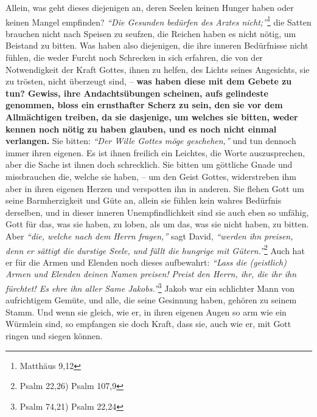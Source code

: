   Allein, was geht dieses
diejenigen an, deren Seelen keinen Hunger haben oder keinen Mangel empfinden?
\textit{"`Die Gesunden bedürfen des Arztes nicht;"'}\footnote{Matthäus 9,12}
die Satten brauchen nicht nach Speisen zu
seufzen, die Reichen haben es nicht nötig, um Beistand zu bitten. Was haben also
diejenigen, die ihre inneren Bedürfnisse  nicht
fühlen, die weder Furcht noch
Schrecken in sich erfahren, die von der Notwendigkeit der Kraft Gottes, ihnen
zu helfen, des Lichts seines Angesichts, sie zu trösten, nicht
überzeugt sind, \label{ref:06_07_sinnlose_gebete}
-- \textbf{was haben diese mit dem Gebete zu tun? Gewiss, ihre Andachtsübungen
scheinen, aufs gelindeste genommen, bloss ein ernsthafter Scherz zu sein, den
sie vor dem Allmächtigen treiben, da sie dasjenige, um welches sie bitten, weder
kennen noch nötig zu haben glauben, und es noch nicht einmal verlangen.} Sie
bitten:
\textit{"`Der Wille Gottes möge geschehen,"'}
und tun dennoch immer ihren
eigenen. Es ist ihnen freilich ein
Leichtes, die Worte auszusprechen, aber die
Sache ist ihnen doch schrecklich. Sie bitten um göttliche Gnade und
missbrauchen die, welche sie haben, -- um den Geist Gottes, widerstreben ihm
aber in ihren eigenen Herzen und verspotten ihn in anderen.
Sie flehen Gott um
seine Barmherzigkeit und Güte an, allein sie fühlen kein wahres Bedürfnis
derselben, und in dieser inneren Unempfindlichkeit sind sie auch eben so
unfähig, Gott für das, was sie haben, zu loben, als um das, was sie nicht haben,
zu bitten. Aber \textit{"`die, welche nach dem Herrn fragen,"'} sagt David,
\textit{"`werden ihn preisen, denn er sättigt die durstige Seele, und füllt
die hungrige mit Gütern."'}\footnote{Psalm 22,26) Psalm 107,9}
Auch hat er für die Armen und Elenden
noch dieses aufbewahrt:
\textit{"`Lass die (geistlich) Armen und Elenden deinen
Namen
preisen! Preist den Herrn, ihr, die ihr ihn fürchtet! Es ehre ihn aller Same
Jakobs."'}\footnote{Psalm 74,21) Psalm 22,24}
Jakob war ein schlichter Mann von
aufrichtigem Gemüte, und alle, die seine Gesinnung haben, gehören zu seinem
Stamm. Und wenn sie gleich, wie er, in ihren eigenen Augen so arm wie ein
Würmlein sind, so empfangen sie doch Kraft, dass sie, auch wie er, mit Gott
ringen und siegen können.

